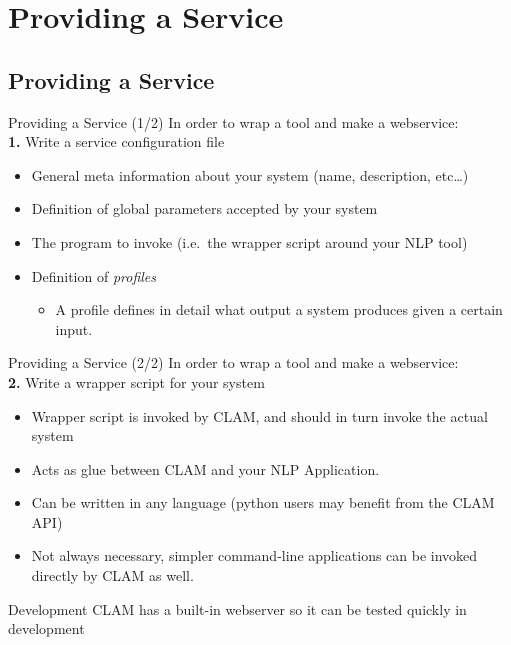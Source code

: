 \documentclass[xcolor=table,10pt,t]{beamer}
\begin{document}
\section{Providing a Service}

\subsection{Providing a Service}

\begin{frame}
    \begin{block}{Providing a Service (1/2)}
        In order to wrap a tool and make a webservice: \\
        \textbf{1.} Write a service configuration file
        \begin{itemize}
            \item General meta information about your system
                {\footnotesize{(name, description, etc\ldots)}}
            \item Definition of global parameters accepted by your system
            \item The program to invoke {\footnotesize{(i.e.\ the wrapper script around your NLP tool)}}
            \item Definition of \emph{profiles}
            \begin{itemize}
                \item A profile defines in detail what output a system produces given a certain input.
            \end{itemize}
        \end{itemize}

    \end{block}

\end{frame}

\begin{frame}
    \begin{block}{Providing a Service (2/2)}
        In order to wrap a tool and make a webservice: \\
        \textbf{2.} Write a wrapper script for your system
        \begin{itemize}
            \item Wrapper script is invoked by CLAM, and should in turn invoke the actual system
            \item Acts as glue between CLAM and your NLP Application.
            \item Can be written in any language (python users may benefit from the CLAM API)
            \item Not always necessary, simpler command-line applications can be invoked directly by CLAM as well.
        \end{itemize}
    \end{block}

    \begin{block}{Development}
        CLAM has a built-in webserver so it can be tested quickly in
        development
    \end{block}

\end{frame}
\end{document}
